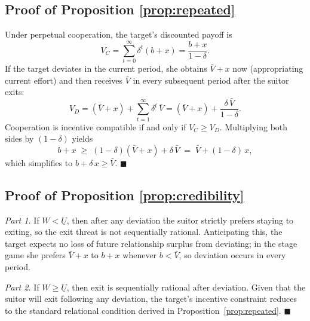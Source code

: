 \documentclass[AER]{AEA}
\begin{document}
\subsection{Proof of Proposition \ref{prop:repeated}}

Under perpetual cooperation, the target's discounted payoff is
\[
V_C = \sum_{t=0}^{\infty}\delta^t(b+x)=\frac{b+x}{1-\delta}.
\]
If the target deviates in the current period, she obtains $\bar{V}+x$ now (appropriating current effort) and then receives $\bar{V}$ in every subsequent period after the suitor exits:
\[
V_D = (\bar{V}+x)+\sum_{t=1}^{\infty}\delta^t\,\bar{V} = (\bar{V}+x)+\frac{\delta\,\bar{V}}{1-\delta}.
\]
Cooperation is incentive compatible if and only if $V_C\ge V_D$.
Multiplying both sides by $(1-\delta)$ yields
\[
b+x \;\ge\; (1-\delta)(\bar{V}+x)+\delta\,\bar{V} \;=\; \bar{V} + (1-\delta)\,x,
\]
which simplifies to $b+\delta\, x\ge \bar{V}$.
\hfill $\blacksquare$

\subsection{Proof of Proposition \ref{prop:credibility}}

\emph{Part 1.}
If $W<\underline{U}$, then after any deviation the suitor strictly prefers staying to exiting, so the exit threat is not sequentially rational.
Anticipating this, the target expects no loss of future relationship surplus from deviating; in the stage game she prefers $\bar{V}+x$ to $b+x$ whenever $b<\bar{V}$, so deviation occurs in every period.

\emph{Part 2.}
If $W\ge \underline{U}$, then exit is sequentially rational after deviation.
Given that the suitor will exit following any deviation, the target's incentive constraint reduces to the standard relational condition derived in Proposition~\ref{prop:repeated}.
\hfill $\blacksquare$
\end{document}
